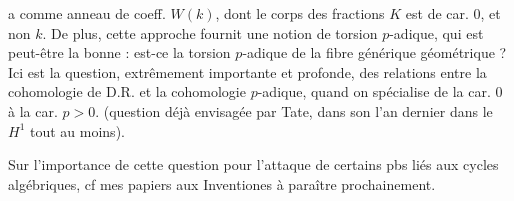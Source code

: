 
a comme anneau de coeff. $W(k)$, dont le corps des fractions $K$ est de car. 0, et non $k$. De plus, cette approche    fournit  une notion de torsion $p$-adique,  qui est peut-être la bonne : est-ce la torsion $p$-adique de la fibre générique géométrique ? Ici est  la question, extrêmement importante et profonde, des relations entre la cohomologie de D.R. et la cohomologie $p$-adique, quand on spécialise de la car. 0 à la car. $p>0$. (question déjà envisagée par Tate,  dans son  l'an dernier dans le  $H^1$ tout au moins).

Sur l'importance de cette question  pour l'attaque de certains pbs liés aux  cycles algébriques, cf mes papiers aux Inventiones \inserted{$[\,]$} à paraître prochainement.

